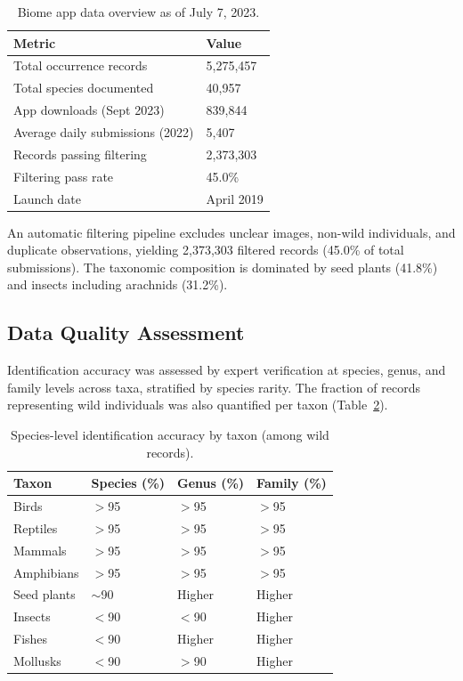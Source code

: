 \documentclass[11pt]{article}
\begin{document}
\begin{table}[htbp]
\centering
\caption{Biome app data overview as of July 7, 2023.}
\label{tab:app}
\begin{tabular}{ll}
\toprule
Metric & Value \\
\midrule
Total occurrence records & 5,275,457 \\
Total species documented & 40,957 \\
App downloads (Sept 2023) & 839,844 \\
Average daily submissions (2022) & 5,407 \\
Records passing filtering & 2,373,303 \\
Filtering pass rate & 45.0\% \\
Launch date & April 2019 \\
\bottomrule
\end{tabular}
\end{table}

An automatic filtering pipeline excludes unclear images, non-wild individuals, and duplicate observations, yielding 2,373,303 filtered records (45.0\% of total submissions). The taxonomic composition is dominated by seed plants (41.8\%) and insects including arachnids (31.2\%).

\subsection{Data Quality Assessment}

Identification accuracy was assessed by expert verification at species, genus, and family levels across taxa, stratified by species rarity. The fraction of records representing wild individuals was also quantified per taxon (Table~\ref{tab:accuracy}).

\begin{table}[htbp]
\centering
\caption{Species-level identification accuracy by taxon (among wild records).}
\label{tab:accuracy}
\begin{tabular}{llll}
\toprule
Taxon & Species (\%) & Genus (\%) & Family (\%) \\
\midrule
Birds & $>$95 & $>$95 & $>$95 \\
Reptiles & $>$95 & $>$95 & $>$95 \\
Mammals & $>$95 & $>$95 & $>$95 \\
Amphibians & $>$95 & $>$95 & $>$95 \\
Seed plants & $\sim$90 & Higher & Higher \\
Insects & $<$90 & $<$90 & Higher \\
Fishes & $<$90 & Higher & Higher \\
Mollusks & $<$90 & $>$90 & Higher \\
\bottomrule
\end{tabular}
\end{table}
\end{document}

